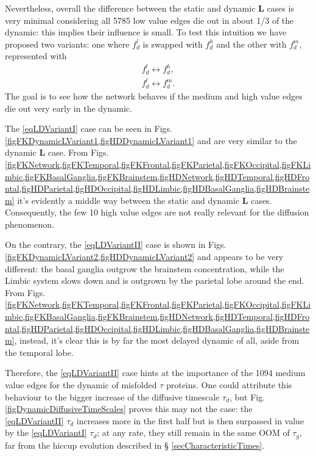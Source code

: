 \documentclass{article}
\begin{document}
                Nevertheless, overall the difference between the sta\-tic and dynamic $\mathbf L$ cases is very minimal considering all \num{5785} low value edges die out in about 1/3 of the dynamic: this implies their influence is small. To test this intuition we have proposed two variants: one where $f_d^l$ is swapped with $f_d^h$ and the other with $f_d^m$, represented with
                \begin{subequations}
                    \begin{align}
                        f_d^l\leftrightarrow f_d^h\tag{V1}\label{eqLDVariantI},\\
                        f_d^l\leftrightarrow f_d^m\tag{V2}\label{eqLDVariantII}.
                    \end{align}
                \end{subequations}
                The goal is to see how the network behaves if the medium and high value edges die out very early in the dynamic.

                The \eqref{eqLDVariantI} case can be seen in Figs. \cref{figFKDynamicLVariant1,figHDDynamicLVariant1} and are very similar to the dynamic $\mathbf L$ case. From Figs. \cref{figFKNetwork,figFKTemporal,figFKFrontal,figFKParietal,figFKOccipital,figFKLimbic,figFKBasalGanglia,figFKBrainstem,figHDNetwork,figHDTemporal,figHDFrontal,figHDParietal,figHDOccipital,figHDLimbic,figHDBasalGanglia,figHDBrainstem} it's evidently a middle way between the static and dynamic $\mathbf L$ cases. Consequently, the few \num{10} high value edges are not really relevant for the diffusion phenomenon.

                On the contrary, the \eqref{eqLDVariantII} case is shown in Figs. \cref{figFKDynamicLVariant2,figHDDynamicLVariant2} and appears to be very different: the basal ganglia outgrow the brainstem concentration, while the Limbic system slows down and is outgrown by the parietal lobe around the end. From Figs. \cref{figFKNetwork,figFKTemporal,figFKFrontal,figFKParietal,figFKOccipital,figFKLimbic,figFKBasalGanglia,figFKBrainstem,figHDNetwork,figHDTemporal,figHDFrontal,figHDParietal,figHDOccipital,figHDLimbic,figHDBasalGanglia,figHDBrainstem}, instead, it's clear this is by far the most delayed dynamic of all, aside from the temporal lobe.

                Therefore, the \eqref{eqLDVariantII} case hints at the importance of the \num{1094} medium value edges for the dynamic of misfolded $\tau$ proteins. One could attribute this behaviour to the bigger increase of the diffusive timescale $\tau_d$, but Fig. \ref{figDynamicDiffusiveTimeScales} proves this may not the case: the \eqref{eqLDVariantII} $\tau_d$ increases more in the first half but is then surpassed in value by the \eqref{eqLDVariantI} $\tau_d$; at any rate, they still remain in the same OOM of $\tau_g$, far from the hiccup evolution described in § \ref{secCharacteristicTimes}.
\end{document}
